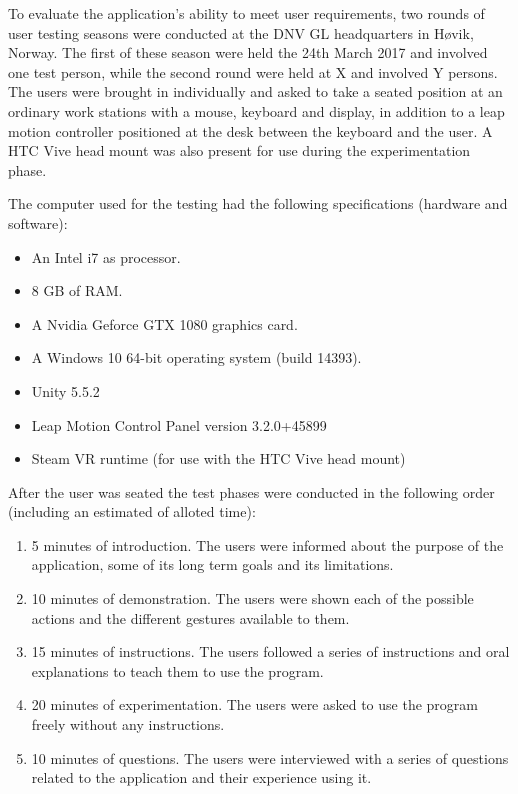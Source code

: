 To evaluate the application's ability to meet user requirements, two rounds of user testing seasons were conducted at the DNV GL headquarters in Høvik, Norway.
The first of these season were held the 24th March 2017 and involved one test person, while the second round were held at X and involved Y persons. 
The users were brought in individually and asked to take a seated position at an ordinary work stations with a mouse, keyboard and display, 
in addition to a leap motion controller positioned at the desk between the keyboard and the user. A HTC Vive head mount was also present for use during the experimentation phase. 

The computer used for the testing had the following specifications (hardware and software):
\begin{itemize}
    \item An Intel i7 as processor.
    \item 8 GB of RAM.
    \item A Nvidia Geforce GTX 1080 graphics card.
    \item A Windows 10 64-bit operating system (build 14393).
    \item Unity 5.5.2
    \item Leap Motion Control Panel version 3.2.0+45899
    \item Steam VR runtime (for use with the HTC Vive head mount)
\end{itemize}

After the user was seated the test phases were conducted in the following order (including an estimated of alloted time):

\begin{enumerate}
    \item  5 minutes of introduction. The users were informed about the purpose of the application, some of its long term goals and its limitations.
    \item 10 minutes of demonstration. The users were shown each of the possible actions and the different gestures available to them.
    \item 15 minutes of instructions. The users followed a series of instructions and oral explanations to teach them to use the program.
    \item 20 minutes of experimentation. The users were asked to use the program freely without any instructions.  
    \item 10 minutes of questions. The users were interviewed with a series of questions related to the application and their experience using it.   
\end{enumerate}

